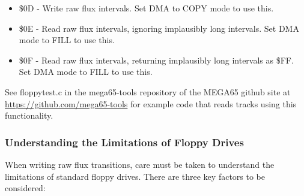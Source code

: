 \begin{itemize}
\item \$0D - Write raw flux intervals. Set DMA to COPY mode to use this.
\item \$0E - Read raw flux intervals, ignoring implausibly long intervals. Set DMA mode to FILL to use this.
\item \$0F - Read raw flux intervals, returning implausibly long intervals as \$FF. Set DMA mode to FILL to use this.
\end{itemize}

See floppytest.c in the mega65-tools repository of the MEGA65 github site at \url{https://github.com/mega65-tools}
for example code that reads tracks using this functionality.

\subsubsection{Understanding the Limitations of Floppy Drives}

When writing raw flux transitions, care must be taken to understand the limitations of standard
floppy drives. There are three key factors to be considered:

